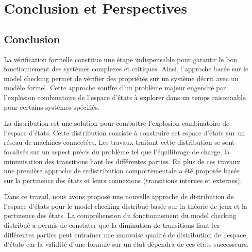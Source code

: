 
\chapter*{Conclusion et Perspectives}

\section*{Conclusion}
La vérification formelle constitue une étape indispensable pour garantir le bon fonctionnement des systèmes complexes et critiques. Ainsi, l’approche basée sur le model checking permet de vérifier des propriétés sur un système décrit avec un modèle formel. Cette approche souffre d'un problème majeur engendré par l'explosion combinatoire de l'espace d'états à explorer  dans un temps raisonnable pour certains systèmes spécifiés.

La distribution est une solution pour combattre l'explosion combinatoire de l'espace d'états. Cette distribution consiste à construire cet espace d'états sur un réseau de machines connectées. Les travaux traitant cette distribution se sont focalisés sur un aspect précis du problème tel que l’équilibrage de charge, la minimisation des transitions liant les différentes parties. En plus de ces travaux une première approche de redistribution comportementale a été proposée basée sur la pertinence des états et leurs connexions (transitions internes et externes).

Dans ce travail, nous avons proposé une nouvelle approche de distribution de l'espace d'états pour le model checking distribué basée sur la théorie de jeux et la pertinence des états. La compréhension du fonctionnement du model checking distribué a permis de constater que la diminution de transitions liant les différentes parties peut entraîner une mauvaise qualité de distribution de l'espace d'états car la validité d'une formule sur un état dépendra de ces états successeurs.

